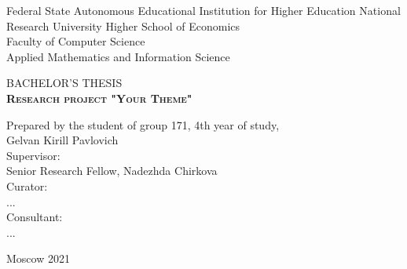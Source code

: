 \begin{titlepage}
\newpage

{
\begin{center}
Federal State Autonomous Educational Institution for Higher Education
National Research University Higher School of Economics
\\
\bigskip
Faculty of Computer Science \\
Applied Mathematics and Information Science \\
\end{center}
}

\vspace{8em}

\begin{center}
{\Large BACHELOR'S THESIS}\\
\textsc{\textbf{
Research project
\linebreak
"Your Theme"}}
\end{center}

\vspace{4em}

{
\hfill\parbox{16cm}{
\hspace*{5cm}\hspace*{-5cm}Prepared by the student of group 171, 4th year of study,\\
Gelvan Kirill Pavlovich\\

\hspace*{5cm}\hspace*{-5cm}Supervisor:\\
Senior Research Fellow, Nadezhda Chirkova
\\

\hspace*{5cm}\hspace*{-5cm}Curator:\\
...\\

\hspace*{5cm}\hspace*{-5cm}Consultant:\\
...\\
}
}

\vspace{\fill}

\begin{center}
Moscow 2021
\end{center}

\end{titlepage}
